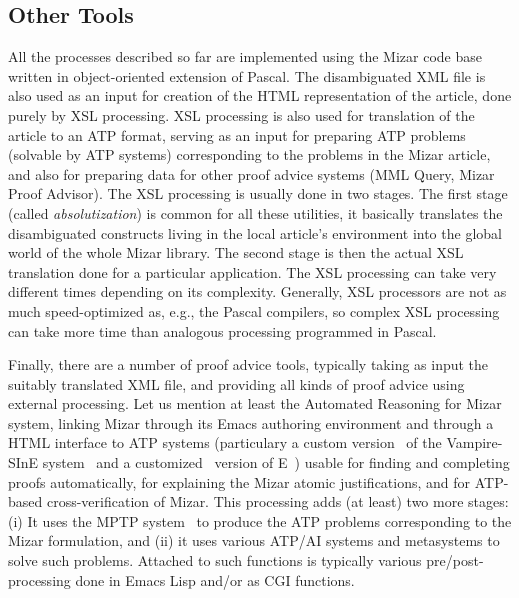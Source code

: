\documentclass{llncs}
\begin{document}
\subsection{Other Tools}
All the processes described so far are implemented using the Mizar
code base written in object-oriented extension of
Pascal. The disambiguated XML file is also used as an input for creation of
the HTML representation of the article, done purely by XSL
processing. XSL processing is also used for translation of the article
to an ATP format, serving as an input for preparing ATP problems
(solvable by ATP systems) corresponding to the problems in the Mizar
article, and also for preparing data for other proof advice systems
(MML Query, Mizar Proof Advisor). The XSL processing is usually done
in two stages. The first stage (called
\emph{absolutization}) is common for all these utilities, it basically
translates the disambiguated constructs living in the local article's
environment into the global world of the whole Mizar library. The
second stage is then the actual XSL translation done for a particular
application. The XSL processing can take very different times
depending on its complexity. Generally, XSL processors are not as much
speed-optimized as, e.g., the Pascal compilers, so complex XSL
processing can take more time than analogous processing programmed in
Pascal.

Finally, there are a number of proof advice tools, typically taking as
input the suitably translated XML file, and providing all kinds of
proof advice using external processing. Let us mention at least the
Automated Reasoning for Mizar~\cite{UrbanS10,abs-1109-0616,KaliszykU13b} system, linking Mizar
through its Emacs authoring environment and through a HTML interface
to ATP systems (particulary a custom version~\cite{UrbanHV10} of the
Vampire-SInE system~\cite{RiazanovV02} and a customized~\cite{blistr} version of E~\cite{Sch02-AICOMM}) usable for finding and
completing proofs automatically, for explaining the Mizar atomic
justifications, and for ATP-based cross-verification of Mizar.  This
processing adds (at least) two more stages: (i) It uses the MPTP
system~\cite{Urb04-MPTP0,Urban06-jar} to produce the ATP problems corresponding to
the Mizar formulation, and (ii) it uses various ATP/AI systems and
metasystems to solve such problems. Attached to such functions is
typically various pre/post-processing done in Emacs Lisp and/or as CGI
functions.
\end{document}

